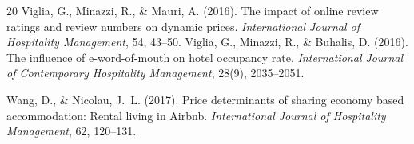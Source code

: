 \documentclass[11pt,a4paper]{article}
\begin{document}
\begin{thebibliography}{20}
Viglia, G., Minazzi, R., \& Mauri, A. (2016). The impact of online review ratings and review numbers on dynamic prices. \textit{International Journal of Hospitality Management}, 54, 43--50.
Viglia, G., Minazzi, R., \& Buhalis, D. (2016). The influence of e-word-of-mouth on hotel occupancy rate. \textit{International Journal of Contemporary Hospitality Management}, 28(9), 2035--2051.

Wang, D., \& Nicolau, J.~L. (2017). Price determinants of sharing economy based accommodation: Rental living in Airbnb. \textit{International Journal of Hospitality Management}, 62, 120--131.

\end{thebibliography}
\end{document}
